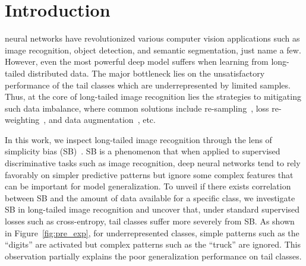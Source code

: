 \documentclass[10pt,journal,compsoc]{IEEEtran}
\begin{document}
\maketitle



\IEEEdisplaynontitleabstractindextext

\IEEEpeerreviewmaketitle

\section{Introduction}

 neural networks have revolutionized various computer vision applications such as image recognition, object detection, and semantic segmentation, just name a few. However, even the most powerful deep model suffers when learning from long-tailed distributed data. The major bottleneck lies on the unsatisfactory performance of the tail classes which are underrepresented by limited samples. Thus, at the core of long-tailed image recognition lies the strategies to mitigating such data imbalance, where common solutions include re-sampling~\cite{he2009learning, buda2018systematic}, loss re-weighting~\cite{huang2019deep, cb-focal, ldam, khan2019striking}, and data augmentation~\cite{feataugeccv20}, etc.

In this work, we inspect long-tailed image recognition through the lens of simplicity bias (SB)~\cite{simpBiasNIPs20, OOD, huh2021low}. SB is a phenomenon that when applied to supervised discriminative tasks such as image recognition, deep neural networks tend to rely favorably on simpler predictive patterns but ignore some complex features that can be important for model generalization. To unveil if there exists correlation between SB and the amount of data available for a specific class, we investigate SB in long-tailed image recognition and uncover that, under standard supervised losses such as cross-entropy, tail classes suffer more severely from SB. As shown in  Figure~\ref{fig:pre_exp}, for underrepresented classes, simple patterns such as the ``digits'' are activated but complex patterns such as the ``truck'' are ignored. This observation partially explains the poor generalization performance on tail classes.
\end{document}
